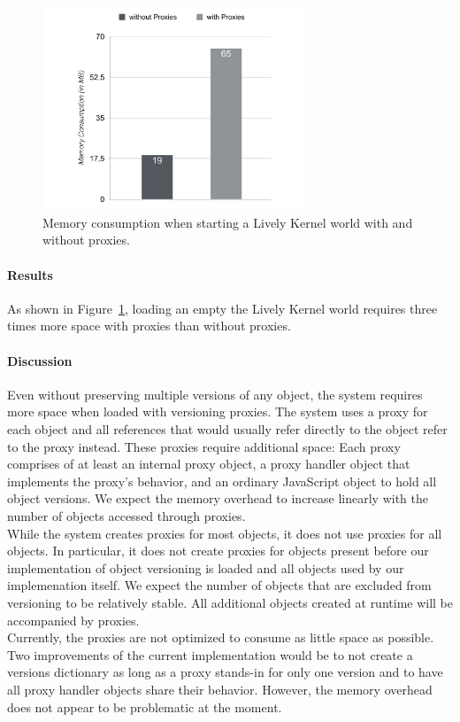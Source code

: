 \begin{figure}[h!]
    \centering
    \includegraphics[width=0.7\textwidth]{figures/6_evaluation/1_memoryOverhead.pdf}
    \caption{Memory consumption when starting a Lively Kernel world with and without proxies.}
    \label{fig:MemoryOverheadForReferences}
\end{figure}

\paragraph{Results}
As shown in Figure~\ref{fig:MemoryOverheadForReferences}, loading an empty the Lively Kernel world requires three times more space with proxies than without proxies.

\paragraph{Discussion}
Even without preserving multiple versions of any object, the system requires more space when loaded with versioning proxies.
The system uses a proxy for each object and all references that would usually refer directly to the object refer to the proxy instead.
These proxies require additional space: Each proxy comprises of at least an internal proxy object, a proxy handler object that implements the proxy's behavior, and an ordinary JavaScript object to hold all object versions.
We expect the memory overhead to increase linearly with the number of objects accessed through proxies.\\
While the system creates proxies for most objects, it does not use proxies for all objects.
In particular, it does not create proxies for objects present before our implementation of object versioning is loaded and all objects used by our implemenation itself.
We expect the number of objects that are excluded from versioning to be relatively stable.
All additional objects created at runtime will be accompanied by proxies.\\
Currently, the proxies are not optimized to consume as little space as possible.
Two improvements of the current implementation would be to not create a versions dictionary as long as a proxy stands-in for only one version and to have all proxy handler objects share their behavior.
However, the memory overhead does not appear to be problematic at the moment.


